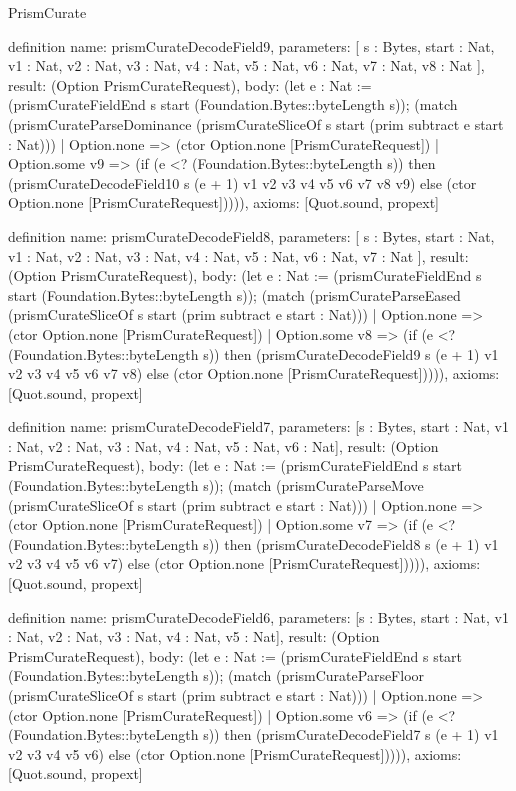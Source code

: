 \begin{lexlean}{PrismCurate}
\begin{semanticmodule}
definition{
  name: prismCurateDecodeField9,
  parameters: [
    s : Bytes,
    start : Nat,
    v1 : Nat,
    v2 : Nat,
    v3 : Nat,
    v4 : Nat,
    v5 : Nat,
    v6 : Nat,
    v7 : Nat,
    v8 : Nat
  ],
  result: (Option PrismCurateRequest),
  body: (let e : Nat := (prismCurateFieldEnd s start (Foundation.Bytes::byteLength s)); (match (prismCurateParseDominance (prismCurateSliceOf s start (prim subtract e start : Nat)))
    | Option.none => (ctor Option.none [PrismCurateRequest])
    | Option.some v9 => (if (e <? (Foundation.Bytes::byteLength s)) then (prismCurateDecodeField10 s (e + 1) v1 v2 v3 v4 v5 v6 v7 v8 v9) else (ctor Option.none [PrismCurateRequest])))),
  axioms: [Quot.sound, propext]
}

definition{
  name: prismCurateDecodeField8,
  parameters: [
    s : Bytes,
    start : Nat,
    v1 : Nat,
    v2 : Nat,
    v3 : Nat,
    v4 : Nat,
    v5 : Nat,
    v6 : Nat,
    v7 : Nat
  ],
  result: (Option PrismCurateRequest),
  body: (let e : Nat := (prismCurateFieldEnd s start (Foundation.Bytes::byteLength s)); (match (prismCurateParseEased (prismCurateSliceOf s start (prim subtract e start : Nat)))
    | Option.none => (ctor Option.none [PrismCurateRequest])
    | Option.some v8 => (if (e <? (Foundation.Bytes::byteLength s)) then (prismCurateDecodeField9 s (e + 1) v1 v2 v3 v4 v5 v6 v7 v8) else (ctor Option.none [PrismCurateRequest])))),
  axioms: [Quot.sound, propext]
}

definition{
  name: prismCurateDecodeField7,
  parameters: [s : Bytes, start : Nat, v1 : Nat, v2 : Nat, v3 : Nat, v4 : Nat, v5 : Nat, v6 : Nat],
  result: (Option PrismCurateRequest),
  body: (let e : Nat := (prismCurateFieldEnd s start (Foundation.Bytes::byteLength s)); (match (prismCurateParseMove (prismCurateSliceOf s start (prim subtract e start : Nat)))
    | Option.none => (ctor Option.none [PrismCurateRequest])
    | Option.some v7 => (if (e <? (Foundation.Bytes::byteLength s)) then (prismCurateDecodeField8 s (e + 1) v1 v2 v3 v4 v5 v6 v7) else (ctor Option.none [PrismCurateRequest])))),
  axioms: [Quot.sound, propext]
}

definition{
  name: prismCurateDecodeField6,
  parameters: [s : Bytes, start : Nat, v1 : Nat, v2 : Nat, v3 : Nat, v4 : Nat, v5 : Nat],
  result: (Option PrismCurateRequest),
  body: (let e : Nat := (prismCurateFieldEnd s start (Foundation.Bytes::byteLength s)); (match (prismCurateParseFloor (prismCurateSliceOf s start (prim subtract e start : Nat)))
    | Option.none => (ctor Option.none [PrismCurateRequest])
    | Option.some v6 => (if (e <? (Foundation.Bytes::byteLength s)) then (prismCurateDecodeField7 s (e + 1) v1 v2 v3 v4 v5 v6) else (ctor Option.none [PrismCurateRequest])))),
  axioms: [Quot.sound, propext]
}


\end{semanticmodule}
\end{lexlean}
